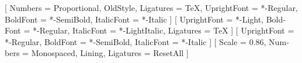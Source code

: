 %

\usepackage{fontspec}
\usepackage{polyglossia}
\setmainlanguage{croatian}

\setmainfont{Literata}[
  Numbers        = {Proportional, OldStyle},
  Ligatures      = TeX,
  UprightFont    = *-Regular,
  BoldFont       = *-SemiBold,
  ItalicFont     = *-Italic ]
\newfontfamily{}[
  UprightFont = *-Light, BoldFont = *-Regular, ItalicFont = *-LightItalic, Ligatures = TeX ]
\newfontfamily{}[
  UprightFont = *-Regular, BoldFont = *-SemiBold, ItalicFont = *-Italic ]
\setmonofont{JetBrains Mono}[
  Scale = 0.86, Numbers = {Monospaced, Lining}, Ligatures = ResetAll ]  %

\usepackage{microtype}
\usepackage{xcolor}
\usepackage{tcolorbox}
\usepackage{marginnote}
\usepackage{ragged2e}
\usepackage{booktabs}
\usepackage{caption}


\color{sttext}

\captionsetup{justification=raggedright, singlelinecheck=false, skip=8pt}

